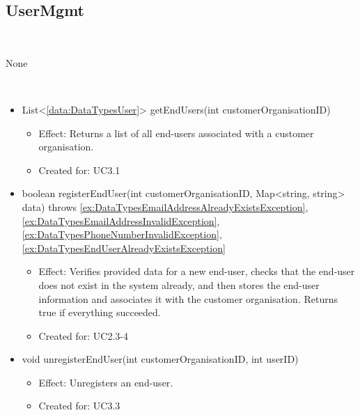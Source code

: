   \subsection{UserMgmt}\label{int:OnlineServiceOnlineServiceCustomerOrganisationFacadeUserMgmt}
    \begin{description}
      \item[Provided by:] \iconcomponent{}~
      \item[Required by:] None
      \item[Operations:] ~
    \begin{itemize}[noitemsep,nolistsep,leftmargin=-.25cm]
      \item \textsf{List\textless{}\ref{data:DataTypesUser}\textgreater{} getEndUsers(int customerOrganisationID)}
        \begin{itemize}[noitemsep,nolistsep]
           \item Effect: Returns a list of all end-users associated with a customer organisation.
\item Created for: UC3.1
        \end{itemize}
      \item \textsf{boolean registerEndUser(int customerOrganisationID, Map\textless{}string, string\textgreater{} data) throws \ref{ex:DataTypesEmailAddressAlreadyExistsException}, \ref{ex:DataTypesEmailAddressInvalidException}, \ref{ex:DataTypesPhoneNumberInvalidException}, \ref{ex:DataTypesEndUserAlreadyExistsException}}
        \begin{itemize}[noitemsep,nolistsep]
           \item Effect: Verifies provided data for a new end-user, checks that the end-user does not exist in the system already, and then stores the end-user information and associates it with the customer organisation. Returns true if everything succeeded.
\item Created for: UC2.3-4
        \end{itemize}
      \item \textsf{void unregisterEndUser(int customerOrganisationID, int userID)}
        \begin{itemize}[noitemsep,nolistsep]
           \item Effect: Unregisters an end-user.
\item Created for: UC3.3
        \end{itemize}
    \end{itemize}
    \end{description}

